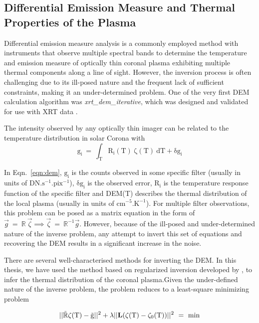 \subsection{Differential Emission Measure and Thermal Properties of the Plasma}\label{sec:c2_dem}

Differential emission measure analysis is a commonly employed method with instruments that observe multiple spectral bands to determine the temperature and emission measure of optically thin coronal plasma exhibiting multiple thermal components along a line of sight. However, the inversion process is often challenging due to its ill-posed nature and the frequent lack of sufficient constraints, making it an under-determined problem. One of the very first DEM calculation algorithm was {\it xrt\_dem\_iterative}, which was designed and validated for use with XRT data \citep{golub04,weber04}.

The intensity observed by any optically thin imager can be related to the temperature distribution in solar Corona with 
\begin{equation}
    \mathrm{g_{i}~=~\int_{T}R_{i}(T)~\zeta(T)~dT+\delta g_{i}}
    \label{eqn:dem}
\end{equation}

In Eqn.~\ref{eqn:dem}, $\mathrm{g_{i}}$ is the counts observed in some specific filter (usually in units of $\mathrm{DN.s^{-1}.pix^{-1}}$), $\mathrm{\delta g_{i}}$ is the observed error, $\mathrm{R_{i}}$ is the temperature response function of the specific filter and DEM(T) describes the thermal distribution of the local plasma  (usually in units of $\mathrm{cm^{-5}.K^{-1}}$). For multiple filter observations, this problem can be posed as a matrix equation in the form of $\Vec{g}~=~\mathbb{R}~\Vec{\zeta}\implies \Vec{\zeta}~=~\mathbb{R}^{-1}\Vec{g}$. However, because of the ill-posed and under-determined nature of the inverse problem, any attempt to invert this set of equations and recovering the DEM results in a significant increase in the noise.

There are several well-characterised methods for inverting the DEM. In this thesis, we have used the method based on regularized inversion developed by \cite{hannah&kontar12}, to infer the thermal distribution of the coronal plasma.Given the under-defined nature of the inverse problem, the problem reduces to a least-square minimizing problem

\begin{equation}
    \mathrm{||\Tilde{\mathbb{R}}\zeta(T)-\Tilde{g}||^{2}+\lambda||{\bf L}(\zeta(T)-\zeta_{0}(T))||^{2}~=~min}
    \label{eqn:dem}
\end{equation}


